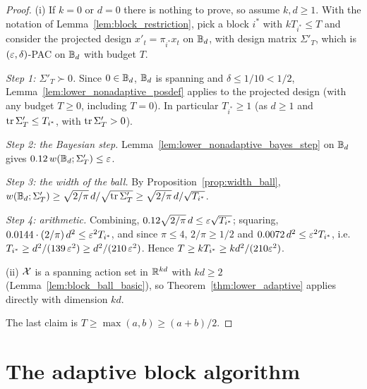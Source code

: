 \begin{proof}
\leanok
{}
(i) If $k = 0$ or $d = 0$ there is nothing to prove, so assume $k, d \ge 1$. With the notation
of Lemma~\ref{lem:block_restriction}, pick a block $i^*$ with $kT_{i^*} \le T$ and consider
the projected design $x'_t = \pi_{i^*}x_t$ on $\mathbb{B}_d$, with design matrix $\Sigma'_T$, which
is $(\varepsilon,\delta)$-PAC on $\mathbb{B}_d$ with budget $T$.

\emph{Step 1: $\Sigma'_T \succ 0$.} Since $0 \in \mathbb{B}_d$, $\mathbb{B}_d$ is spanning and
$\delta \le 1/10 < 1/2$, Lemma~\ref{lem:lower_nonadaptive_posdef} applies to the projected
design (with any budget $T \ge 0$, including $T = 0$). In particular $T_{i^*} \ge 1$ (as
$d \ge 1$ and $\operatorname{tr}\Sigma'_T \le T_{i^*}$, with $\operatorname{tr}\Sigma'_T > 0$).

\emph{Step 2: the Bayesian step.} Lemma~\ref{lem:lower_nonadaptive_bayes_step} on $\mathbb{B}_d$
gives $0.12\,w(\mathbb{B}_d;\Sigma'_T) \le \varepsilon$.

\emph{Step 3: the width of the ball.} By Proposition~\ref{prop:width_ball},
$w(\mathbb{B}_d;\Sigma'_T) \ge \sqrt{2/\pi}\,d/\sqrt{\operatorname{tr}\Sigma'_T} \ge \sqrt{2/\pi}\,d/\sqrt{T_{i^*}}$.

\emph{Step 4: arithmetic.} Combining, $0.12\sqrt{2/\pi}\,d \le \varepsilon\sqrt{T_{i^*}}$; squaring,
$0.0144\cdot(2/\pi)\,d^2 \le \varepsilon^2T_{i^*}$, and since $\pi \le 4$, $2/\pi \ge 1/2$ and
$0.0072\,d^2 \le \varepsilon^2 T_{i^*}$, i.e.\ $T_{i^*} \ge d^2/(139\,\varepsilon^2) \ge d^2/(210\,\varepsilon^2)$.
Hence $T \ge kT_{i^*} \ge kd^2/(210\varepsilon^2)$.

(ii) $\mathcal{X}$ is a spanning action set in $\mathbb{R}^{kd}$ with $kd \ge 2$
(Lemma~\ref{lem:block_ball_basic}), so Theorem~\ref{thm:lower_adaptive} applies directly with
dimension $kd$.

The last claim is $T \ge \max(a,b) \ge (a+b)/2$.
\end{proof}

\section{The adaptive block algorithm}
\label{sec:separation_algorithm}

